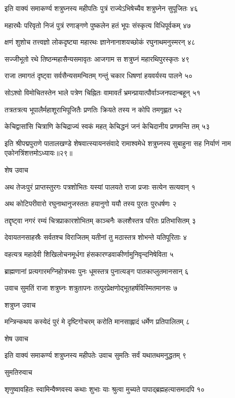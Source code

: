 इति वाक्यं समाकर्ण्य शत्रुघ्नस्य महीपतिः
पुत्रं राज्येऽभिषेच्यैव शत्रुघ्नेन सुपूजितः ४६

महारथैः परिवृतो निजं पुत्रं रणाङ्गणे
पुष्कलेन हतं भूपः संस्कृत्य विधिपूर्वकम् ४७

क्षणं शुशोच तत्त्वज्ञो लोकदृष्ट्या महारथः
ज्ञानेनानाशयच्छोकं रघुनाथमनुस्मरन् ४८

सज्जीभूतो रथे तिष्ठन्महासैन्यसमावृतः
आजगाम स शत्रुघ्नं महारथिपुरस्कृतः ४९

राजा तमागतं दृष्ट्वा सर्वसैन्यसमन्वितम्
गन्तुं चकार धिषणां हयवर्यस्य पालने ५०

सोऽश्वो विमोचितस्तेन भाले पत्रेण चिह्नितः
वामावर्तं भ्रमन्प्रायात्पौर्वाञ्जनपदान्बहून् ५१

तत्रतत्रत्य भूपालैर्महाशूराभिपूजितैः
प्रणतिः क्रियते तस्य न कोपि तमगृह्णत ५२

केचिद्वासांसि चित्राणि केचिद्राज्यं स्वकं महत्
केचिद्धनं जनं केचिदानीय प्रणमन्ति तम् ५३

इति श्रीपद्मपुराणे पातालखण्डे शेषवात्स्यायनसंवादे रामाश्वमेधे शत्रुघ्नस्य सुबाहुना सह निर्याणं नाम एकोनत्रिंशत्तमोऽध्यायः॥२९॥


शेष उवाच

अथ तेजःपुरं प्राप्तस्तुरगः पत्रशोभितः
यस्यां पालयते राजा प्रजाः सत्येन सत्यवान् १

अथ कोटिपरीवारो रघुनाथानुजस्ततः
हयानुगो ययौ तस्य पुरतः पुरधर्षणः २

तद्दृष्ट्वा नगरं रम्यं चित्रप्राकारशोभितम्
काञ्चनैः कलशैस्तत्र परितः प्रतिभासितम् ३

देवायतनसाहस्रैः सर्वतश्च विराजितम्
यतीनां तु मठास्तत्र शोभन्ते यतिपूरिताः ४

वहत्यत्र महादेवी शिखिलोचनमूर्धगा
हंसकारण्डवाकीर्णामुनिवृन्दनिषेविता ५

ब्राह्मणानां प्रत्यगारमग्निहोत्रभवः पुनः
धूमस्तत्र पुनात्यङ्ग पातकाप्लुतमानसान् ६

उवाच सुमतिं राजा शत्रुघ्नः शत्रुतापनः
तत्पुरप्रेक्षणोद्भूतहर्षविस्मितमानसः ७

शत्रुघ्न उवाच

मन्त्रिन्कथय कस्येदं पुरं मे दृष्टिगोचरम्
करोति मानसाह्लादं धर्मेण प्रतिपालितम् ८

शेष उवाच

इति वाक्यं समाकर्ण्य शत्रुघ्नस्य महीपतेः
उवाच सुमतिः सर्वं यथातथमनुद्धतम् ९

सुमतिरुवाच

शृणुष्वावहितः स्वामिन्वैष्णवस्य कथाः शुभाः
याः श्रुत्वा मुच्यते पापाद्ब्रह्महत्यासमादपि १०

